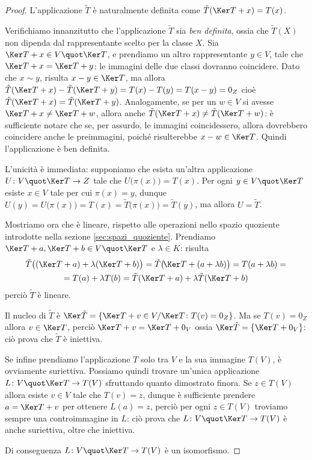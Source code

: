 \begin{proof}
	L'applicazione $\tilde{T}$ è naturalmente definita come $\tilde{T}(\Ker T+x)=T(x)$.

	Verifichiamo innanzitutto che l'applicazione $\tilde{T}$ sia \emph{ben definita}, ossia che $\tilde{T}(X)$ non dipenda dal rappresentante scelto per la classe	$X$.
	Sia $\Ker T+x\in V\quot\Ker T$, e prendiamo un altro rappresentante $y\in V$, tale che $\Ker T+x=\Ker T+y$: le immagini delle due classi dovranno coincidere.
	Dato che $x\sim y$, risulta $x-y\in\Ker T$, ma allora $\tilde{T}(\Ker T+x)-\tilde{T}(\Ker T+y)=T(x)-T(y)=T(x-y)=0_Z$ cioè $\tilde{T}(\Ker T+x)=\tilde{T}(\Ker T+y)$.
	Analogamente, se per un $w\in V$ si avesse $\Ker T+x\ne\Ker T+w$, allora anche $\tilde{T}(\Ker T+x)\ne\tilde{T}(\Ker T+w)$: è sufficiente notare che se, per assurdo, le immagini coincidessero, allora dovrebbero coincidere anche le preimmagini, poich\'e risulterebbe $x-w\in\Ker T$.
	Quindi l'applicazione è ben definita.

	L'unicità è immediata: supponiamo che esista un'altra applicazione $U\colon V\quot\Ker T\to Z$ tale che $U\big(\pi(x)\big)=T(x)$.
	Per ogni $y\in V\quot\Ker T$ esiste $x\in V$ tale per cui $\pi(x)=y$, dunque $U(y)=U\big(\pi(x)\big)=T(x)=\tilde{T}\big(\pi(x)\big)=\tilde{T}(y)$, ma allora $U=\tilde{T}$.

	Mostriamo ora che è lineare, rispetto alle operazioni nello spazio quoziente introdotte nella sezione \ref{sec:spazi_quoziente}.
	Prendiamo $\Ker T+a,\Ker T+b\in V\quot\Ker T$ e $\lambda\in K$: risulta
	\begin{multline}
		\tilde{T}\big((\Ker T+a)+\lambda(\Ker T+b)\big)=\tilde{T}\big(\!\Ker T+(a+\lambda b)\big)=T(a+\lambda b)=\\=T(a)+\lambda T(b)=\tilde{T}(\Ker T+a)+\lambda\tilde{T}(\Ker T+b)
	\end{multline}
	perciò $\tilde{T}$ è lineare.

	Il nucleo di $\tilde{T}$ è $\Ker\tilde{T}=\{\Ker T+v\in V/\Ker T\colon T(v)=0_Z\}$.
	Ma se $T(v)=0_Z$ allora $v\in\Ker T$, perciò $\Ker T+v=\Ker T+0_V$ ossia $\Ker\tilde{T}=\{\Ker T+0_V\}$: ciò prova che $\tilde{T}$ è iniettiva.

	Se infine prendiamo l'applicazione $T$ solo tra $V$ e la sua immagine $T(V)$, è ovviamente suriettiva.
	Possiamo quindi trovare un'unica applicazione $L\colon V\quot\Ker T\to T(V)$ sfruttando quanto dimostrato finora.
	Se $z\in T(V)$ allora esiste $v\in V$ tale che $T(v)=z$, dunque è sufficiente prendere $a=\Ker T+v$ per ottenere $L(a)=z$, perciò per ogni $z\in T(V)$ troviamo sempre una controimmagine in $L$: ciò prova che $L\colon V\quot\Ker T\to T(V)$ è anche suriettiva, oltre che iniettiva.
	
	Di conseguenza $L\colon V\quot\Ker T\to T(V)$ è un isomorfismo.
\end{proof}

